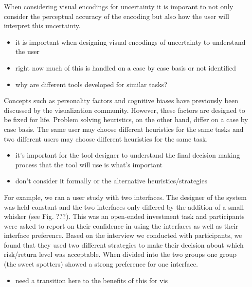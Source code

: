 When considering visual encodings for uncertainty it is imporant to not
only consider the perceptual accuracy of the encoding but also how the
user will interpret this uncertainty.

\begin{itemize}
\tightlist
\item
  it is important when designing visual encodings of uncertainty to
  understand the user
\item
  right now much of this is handled on a case by case basis or not
  identified
\item
  why are different tools developed for similar tasks?
\end{itemize}


Concepts such as personality factors \citep{ref} and cognitive biases
\citep{ref} have previously been discussed by the visualization
community. However, these factors are designed to be fixed for life.
Problem solving heuristics, on the other hand, differ on a case by case
basis. The same user may choose different heuristics for the same tasks
and two different users may choose different heuristics for the same
task.

\begin{itemize}
\tightlist
\item
  it's important for the tool designer to understand the final decision
  making process that the tool will use is what's important
\item
  don't consider it formally or the alternative heuristics/strategies
\end{itemize}

For example, we ran a user study with two interfaces. The designer of
the system was held constant and the two interfaces only differed by the
addition of a small whisker (see Fig. ???). This was an open-ended
investment task and participants were asked to report on their
confidence in using the interfaces as well as their interface
preference. Based on the interview we conducted with participants, we
found that they used two different strategies to make their decision
about which risk/return level was acceptable. When divided into the two
groups one group (the sweet spotters) showed a strong preference for one
interface.

\begin{itemize}
\tightlist
\item
  need a transition here to the benefits of this for vis
\end{itemize}

